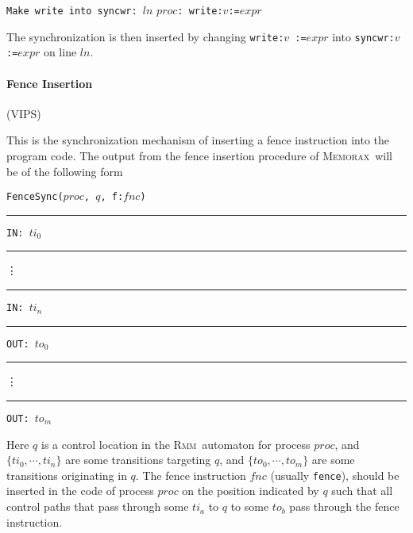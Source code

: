\documentclass[a4paper]{article}
\newcommand{\memorax}{\textsc{Memorax}}
\newcommand{\rmm}{\textsc{Rmm}}
\begin{document}
\vspace{10pt}

\noindent
{\tt Make write into syncwr: }$ln$ $proc${\tt : write:}$v${\tt :=}$expr$

\vspace{10pt}

The synchronization is then inserted by changing {\tt write:}$v${\tt
  :=}$expr$ into {\tt syncwr:}$v${\tt :=}$expr$ on line $ln$.

\paragraph{Fence Insertion}\hfill(VIPS)

This is the synchronization mechanism of inserting a fence instruction
into the program code. The output from the fence insertion procedure
of \memorax\ will be of the following form

\vspace{10pt}

\noindent
{\tt FenceSync(}$proc${\tt , }$q${\tt , f:}$fnc${\tt)}\\
\rule{10pt}{0pt}{\tt IN: }$ti_0$\\
\rule{10pt}{0pt}\vdots\\
\rule{10pt}{0pt}{\tt IN: }$ti_n$\\
\rule{10pt}{0pt}{\tt OUT: }$to_0$\\
\rule{10pt}{0pt}\vdots\\
\rule{10pt}{0pt}{\tt OUT: }$to_m$\\

\vspace{10pt}

Here $q$ is a control location in the \rmm\ automaton for process
$proc$, and $\{ti_0,\cdots,ti_n\}$ are some transitions targeting $q$,
and $\{to_0,\cdots,to_m\}$ are some transitions originating in
$q$.
%
The fence instruction $fnc$ (usually {\tt fence}), should be inserted
in the code of process $proc$ on the position indicated by $q$ such
that all control paths that pass through some $ti_a$ to $q$ to some
$to_b$ pass through the fence instruction.

{}



\pagebreak
{}
{}

\end{document}

